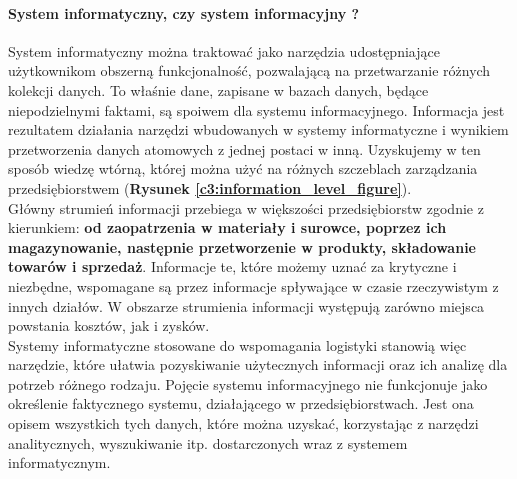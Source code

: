 		\paragraph{System informatyczny, czy system informacyjny ?}
		System informatyczny można traktować jako narzędzia udostępniające użytkownikom 
		obszerną funkcjonalność, pozwalającą na przetwarzanie różnych kolekcji danych.
		To właśnie dane, zapisane w bazach danych, będące niepodzielnymi faktami, są 
		spoiwem dla systemu informacyjnego. Informacja jest rezultatem działania
		narzędzi wbudowanych w systemy informatyczne i wynikiem przetwo\-rzenia danych 
		atomowych z jednej postaci w inną. Uzyskujemy w ten sposób wiedzę wtórną, której można 
		użyć na różnych szczeblach zarządzania przedsiębiorstwem (\textbf{Rysunek \ref{c3:information_level_figure}}). \\
		
		Główny strumień informacji przebiega w większości przedsiębiorstw zgodnie z kierunkiem: 
		\textbf{od zaopatrzenia w materiały i surowce, poprzez ich magazynowanie, następnie przetwo\-rzenie 
		w produkty, składowanie towarów i sprzedaż}. Informacje te, które możemy uznać za krytyczne
		i niezbędne, wspomagane są przez informacje spływające w czasie rzeczywistym z innych działów. 
		W obszarze strumienia informacji występują zarówno miejsca powstania kosztów, jak i zysków.  \\
		
		Systemy informatyczne stosowane do wspomagania logistyki stanowią więc narzędzie, które
		ułatwia pozyskiwanie użytecznych informacji oraz ich analizę dla potrzeb różnego rodzaju. 
		Pojęcie systemu informacyjnego nie funkcjonuje jako określenie faktycznego systemu, działającego
		w przedsiębiorstwach. Jest ona opisem wszystkich tych danych, które można uzyskać, korzystając
		z narzędzi analitycznych, wyszukiwanie itp. dostarczonych wraz z systemem informatycznym.
		
